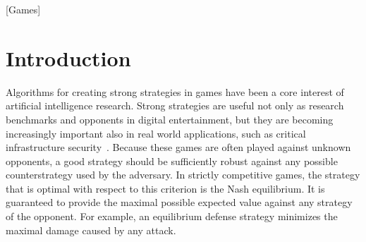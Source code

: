\documentclass{aamas2015}
\begin{document}

[Games]






\section{Introduction}

Algorithms for creating strong strategies in games have been a core interest of artificial intelligence research. Strong strategies are useful not only as research benchmarks and opponents in digital entertainment, but they are becoming increasingly important also in real world applications, such as critical infrastructure security~\cite{Tambe11}.
Because these games are often played against unknown opponents, a good strategy should be sufficiently robust against any possible counterstrategy used by the adversary. In strictly competitive games, the strategy that is optimal with respect to this criterion is the Nash equilibrium. It is guaranteed to provide the maximal possible expected value against any strategy of the opponent. For example, an equilibrium defense strategy minimizes the maximal damage caused by any attack.
\end{document}
